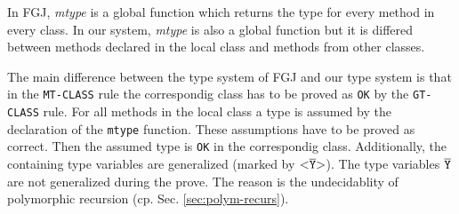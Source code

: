 In FGJ, \textit{mtype} is a global function which returns the type for every method in every class.
In our system, \textit{mtype} is also a global function but it is differed between
methods declared in the local class and methods from other classes.

The main difference between the type system of FGJ and our type system is that
in the \texttt{MT-CLASS} rule the correspondig class has to be proved as \texttt{OK}
by the \texttt{GT-CLASS} rule.
For all methods in the local class a type is assumed by the declaration of the \texttt{mtype} function.
These assumptions have to be proved as correct. Then the assumed type is
\texttt{OK} in the correspondig class. Additionally, the containing type
variables are generalized (marked by $\mathtt{ {\tt <} \overline{\tt Y} {\tt >} }$). The type variables
$\overline{\tt \mathtt{Y}}$ are not generalized during the prove. The reason is the
undecidablity of polymorphic recursion (cp. Sec. \ref{sec:polym-recurs}).


